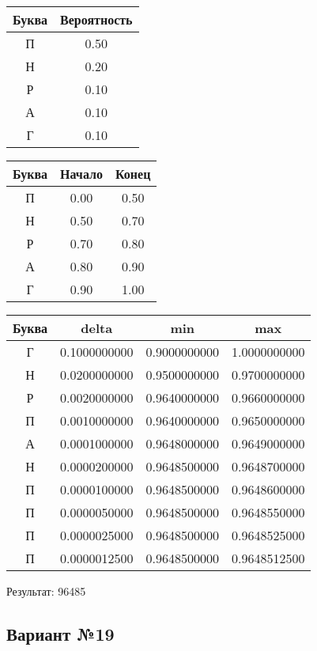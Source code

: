 \documentclass[a4paper, 12pt]{article}
\begin{document}
\begin{center}
 \begin{tabular}{ |c|c| } 
  \hline
     Буква & Вероятность \\ \hline
П & 0.50\\\hline
Н & 0.20\\\hline
Р & 0.10\\\hline
А & 0.10\\\hline
Г & 0.10
\\ \hline \end{tabular}
\end{center}
\begin{center}
 \begin{tabular}{ |c|c|c| } 
  \hline
     Буква & Начало & Конец \\ \hline
П & 0.00 & 0.50\\\hline
Н & 0.50 & 0.70\\\hline
Р & 0.70 & 0.80\\\hline
А & 0.80 & 0.90\\\hline
Г & 0.90 & 1.00
\\ \hline \end{tabular}
\end{center}
\begin{center}
 \begin{tabular}{ |c|c|c|c| } 
  \hline
     Буква & delta & min & max \\ \hline
Г & 0.1000000000 & 0.9000000000 & 1.0000000000\\\hline
Н & 0.0200000000 & 0.9500000000 & 0.9700000000\\\hline
Р & 0.0020000000 & 0.9640000000 & 0.9660000000\\\hline
П & 0.0010000000 & 0.9640000000 & 0.9650000000\\\hline
А & 0.0001000000 & 0.9648000000 & 0.9649000000\\\hline
Н & 0.0000200000 & 0.9648500000 & 0.9648700000\\\hline
П & 0.0000100000 & 0.9648500000 & 0.9648600000\\\hline
П & 0.0000050000 & 0.9648500000 & 0.9648550000\\\hline
П & 0.0000025000 & 0.9648500000 & 0.9648525000\\\hline
П & 0.0000012500 & 0.9648500000 & 0.9648512500
\\ \hline \end{tabular}
\end{center}
Результат: 96485
\pagebreak
\subsection{Вариант №19}
\end{document}
